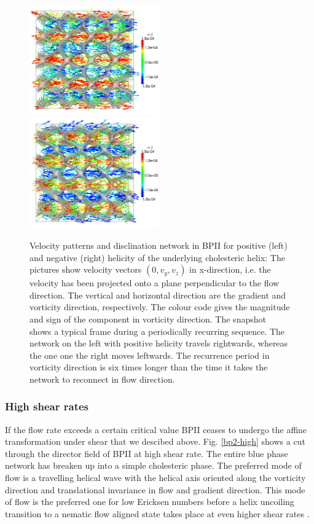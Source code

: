 \documentclass[aps,pre,reprint,superscriptaddress, twocolumn]{revtex4}
\begin{document}
\begin{figure}[ht]
\includegraphics[width=0.495\textwidth]{v_yz-v_z-160k_run902.png}
\includegraphics[width=0.495\textwidth]{v_yz-v_z-160k_run903.png}
\caption{Velocity patterns and disclination network in BPII for positive (left) and negative (right) helicity of the 
underlying cholesteric helix: The pictures show velocity vectors $(0,v_y,v_z)$ in x-direction, 
i.e. the velocity has been projected onto a plane perpendicular to the flow direction. 
The vertical and horizontal direction are the gradient and vorticity direction, respectively.
The colour code gives the magnitude and sign of the component in vorticity direction.
The snapshot shows a typical frame during a periodically recurring sequence.
The network on the left with positive helicity travels rightwards, whereas the one one the right
moves leftwards. The recurrence period in vorticity direction is six times longer than the time it takes the network 
to reconnect in flow direction.}
\label{bp2-velo}
\end{figure}

\subsubsection{High shear rates}

If the flow rate exceeds a certain critical value BPII ceases to undergo the affine transformation under shear that we
descibed above. Fig. \ref{bp2-high} shows a cut through the director field of BPII at high shear rate.
The entire blue phase network has breaken up into a simple cholesteric phase. The preferred mode of flow is 
a travelling helical wave with the helical axis oriented along the vorticity direction and translational 
invariance in flow and gradient direction. This mode of flow is the preferred one for low Ericksen numbers
before a helix uncoiling transition to a nematic flow aligned state takes place at even higher
shear rates \cite{Rey:1996a, Rey:1996b}.
\end{document}
